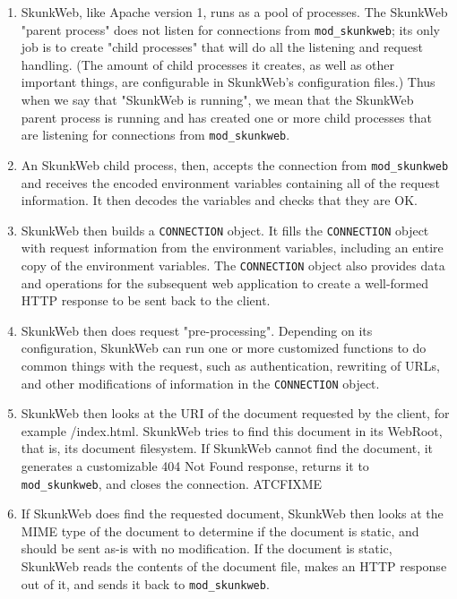 \documentclass[titlepage]{manual}
\begin{document}
\begin{enumerate}
\item SkunkWeb, like Apache version 1, runs as a pool of
processes. The SkunkWeb "parent process" does not listen for
connections from \texttt{mod\_skunkweb}; its only job is to create
"child processes" that will do all the listening and request
handling. (The amount of child processes it creates, as well as other
important things, are configurable in SkunkWeb's configuration files.)
Thus when we say that "SkunkWeb is running", we mean that the SkunkWeb
parent process is running and has created one or more child processes
that are listening for connections from \texttt{mod\_skunkweb}.

\item An SkunkWeb child process, then, accepts the connection from
\texttt{mod\_skunkweb} and receives the encoded environment variables
containing all of the request information. It then decodes the
variables and checks that they are OK.

\item SkunkWeb then builds a \texttt{CONNECTION} object. It fills the
\texttt{CONNECTION} object with request information from the environment
variables, including an entire copy of the environment variables.  The
\texttt{CONNECTION} object also provides data and operations for the subsequent
web application to create a well-formed HTTP response to be sent back
to the client.

\item SkunkWeb then does request "pre-processing". Depending on its
configuration, SkunkWeb can run one or more customized functions to do
common things with the request, such as authentication, rewriting of
URLs, and other modifications of information in the \texttt{CONNECTION} object.

\item SkunkWeb then looks at the URI of the document requested by the
client, for example /index.html. SkunkWeb tries to find this document
in its WebRoot, that is, its document filesystem. If SkunkWeb cannot
find the document, it generates a customizable 404 Not Found response,
returns it to \texttt{mod\_skunkweb}, and closes the connection.
ATCFIXME

\item If SkunkWeb does find the requested document, SkunkWeb then
looks at the MIME type of the document to determine if the document
is static, and should be sent as-is with no modification. If the
document is static, SkunkWeb reads the contents of the document file,
makes an HTTP response out of it, and sends it back to
\texttt{mod\_skunkweb}.


\end{enumerate}
\end{document}
